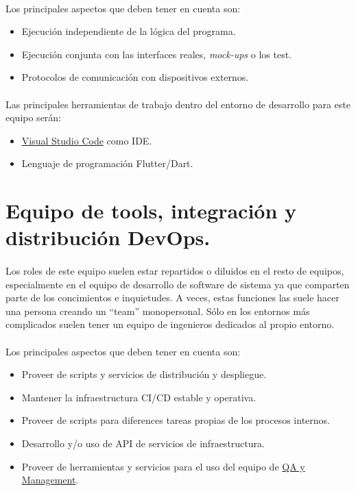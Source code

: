 \paragraph{}Los principales aspectos que deben tener en cuenta son:

\begin{itemize}
    \item Ejecución independiente de la lógica del programa.
    \item Ejecución conjunta con las interfaces reales, \emph{mock-ups} o los test.
    \item Protocolos de comunicación con dispositivos externos.
\end{itemize}

\paragraph{}Las principales herramientas de trabajo dentro del entorno de desarrollo
para este equipo serán:

\begin{itemize}
    \item \hyperref[sec:vscode]{Visual Studio Code} como \gls{IDE}.
    \item Lenguaje de programación Flutter/Dart.
\end{itemize}

\section{Equipo de tools, integración y distribución DevOps.}

\paragraph{}Los roles de este equipo suelen estar repartidos o diluidos en el resto de
equipos, especialmente en el equipo de desarrollo de software de sistema ya que comparten
parte de los concimientos e inquietudes. A veces, estas funciones las suele hacer una
persona creando un ``team'' monopersonal. Sólo en los entornos más complicados suelen
tener un equipo de ingenieros dedicados al propio entorno.


\paragraph{}Los principales aspectos que deben tener en cuenta son:

\begin{itemize}
    \item Proveer de scripts y servicios de distribución y despliegue.
    \item Mantener la infraestructura \gls{CI/CD} estable y operativa.
    \item Proveer de scripts para diferences tareas propias de los procesos internos.
    \item Desarrollo y/o uso de \gls{API} de servicios de infraestructura.
    \item Proveer de herramientas y servicios para el uso del equipo de
    \hyperref[sec:testingqa]{QA y Management}.
\end{itemize}

